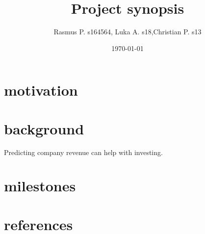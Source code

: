 \documentclass{article}
\title{Project synopsis}
\author{Rasmus P. s164564, Luka A. s18,Christian P. s13}
\date{\today}
\begin{document}
\section*{motivation}

\section*{background}
Predicting company revenue can help with investing.
\section*{milestones}

\section*{references}
\end{document}
